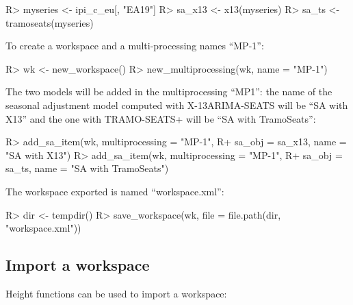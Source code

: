 \documentclass[article]{jss}
\begin{document}
\begin{CodeChunk}

\begin{CodeInput}
R> myseries <- ipi_c_eu[, "EA19"]
R> sa_x13 <- x13(myseries)
R> sa_ts <- tramoseats(myseries)
\end{CodeInput}
\end{CodeChunk}

To create a workspace and a multi-processing names ``MP-1'':

\begin{CodeChunk}

\begin{CodeInput}
R> wk <- new_workspace()
R> new_multiprocessing(wk, name = "MP-1")
\end{CodeInput}
\end{CodeChunk}

The two models will be added in the multiprocessing ``MP1'': the name of
the seasonal adjustment model computed with X-13ARIMA-SEATS will be ``SA
with X13'' and the one with TRAMO-SEATS+ will be ``SA with TramoSeats'':

\begin{CodeChunk}

\begin{CodeInput}
R> add_sa_item(wk, multiprocessing = "MP-1",
R+             sa_obj = sa_x13, name =  "SA with X13")
R> add_sa_item(wk, multiprocessing =  "MP-1",
R+             sa_obj = sa_ts, name = "SA with TramoSeats")
\end{CodeInput}
\end{CodeChunk}

The workspace exported is named ``workspace.xml'':

\begin{CodeChunk}

\begin{CodeInput}
R> dir <- tempdir()
R> save_workspace(wk, file =  file.path(dir, "workspace.xml"))
\end{CodeInput}
\end{CodeChunk}

\hypertarget{import-a-workspace}{%
\subsection{Import a workspace}\label{import-a-workspace}}

Height functions can be used to import a workspace:
\end{document}
